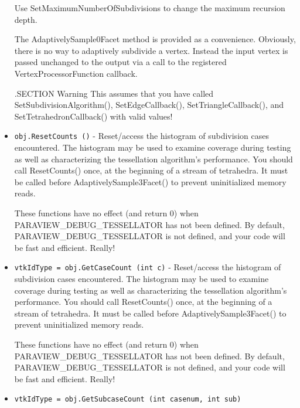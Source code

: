\begin{itemize}
 Use  SetMaximumNumberOfSubdivisions to change the maximum
 recursion depth.

 The AdaptivelySample0Facet method is provided as a convenience.
 Obviously, there is no way to adaptively subdivide a vertex.
 Instead the input vertex is passed unchanged to the output
 via a call to the registered VertexProcessorFunction callback.

 .SECTION Warning
 This assumes that you have called SetSubdivisionAlgorithm(),
 SetEdgeCallback(), SetTriangleCallback(), and SetTetrahedronCallback()
 with valid values!

\item  \verb|obj.ResetCounts ()| -  Reset/access the histogram of subdivision cases encountered.
 The histogram may be used to examine coverage during testing as well as characterizing the
 tessellation algorithm's performance.
 You should call ResetCounts() once, at the beginning of a stream of tetrahedra.
 It must be called before AdaptivelySample3Facet() to prevent uninitialized memory reads.

 These functions have no effect (and return 0) when PARAVIEW\_DEBUG\_TESSELLATOR has not been defined.
 By default, PARAVIEW\_DEBUG\_TESSELLATOR is not defined, and your code will be fast and efficient. Really!

\item  \verb|vtkIdType = obj.GetCaseCount (int c)| -  Reset/access the histogram of subdivision cases encountered.
 The histogram may be used to examine coverage during testing as well as characterizing the
 tessellation algorithm's performance.
 You should call ResetCounts() once, at the beginning of a stream of tetrahedra.
 It must be called before AdaptivelySample3Facet() to prevent uninitialized memory reads.

 These functions have no effect (and return 0) when PARAVIEW\_DEBUG\_TESSELLATOR has not been defined.
 By default, PARAVIEW\_DEBUG\_TESSELLATOR is not defined, and your code will be fast and efficient. Really!

\item  \verb|vtkIdType = obj.GetSubcaseCount (int casenum, int sub)|

\end{itemize}
